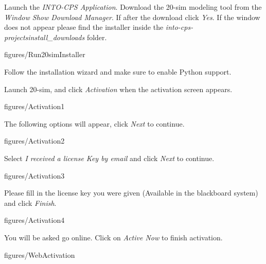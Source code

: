 \documentclass[11pt,a4paper]{../tutorial}
\begin{document}
\begin{instructions} 

\item Launch the \emph{INTO-CPS Application}. Download the 20-sim modeling tool from the  \emph{Window \menusep Show Download Manager}. If after the download click \emph{Yes}. If the window does not appear please find the installer inside the \emph{into-cps-projects\pathsep install\_downloads} folder.

\begin{annotation}[width=0.85\linewidth]{figures/Run20simInstaller}
\end{annotation}

\newpage

\item Follow the installation wizard and make sure to enable Python support.

\item Launch 20-sim, and click \emph{Activation} when the activation screen appears.

\begin{annotation}[width=0.5\linewidth]{figures/Activation1}
\end{annotation}

\item The following options will appear, click \emph{Next} to continue. 

\begin{annotation}[width=0.5\linewidth]{figures/Activation2}
\end{annotation}

\item Select \emph{I received a license Key by email} and click \emph{Next} to continue. 

\begin{annotation}[width=0.5\linewidth]{figures/Activation3}
\end{annotation}

\newpage 
\item Please fill in the license key you were given (Available in the blackboard system) and click \emph{Finish}.
	
\begin{annotation}[width=0.5\linewidth]{figures/Activation4}
\end{annotation}

\item You will be asked go online. Click on \emph{Active Now} to finish activation. 
	
\begin{annotation}[width=0.5\linewidth]{figures/WebActivation}
\end{annotation}

\end{instructions}
\end{document}
